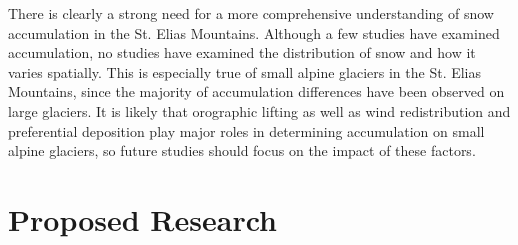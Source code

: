 \documentclass[12pt]{article}
\begin{document}
There is clearly a strong need for a more comprehensive understanding of snow accumulation in the St. Elias Mountains. Although a few studies have examined accumulation, no studies have examined the distribution of snow and how it varies spatially. This is especially true of small alpine glaciers in the St. Elias Mountains, since the majority of accumulation differences have been observed on large glaciers. It is likely that orographic lifting as well as wind redistribution and preferential deposition play major roles in determining accumulation on small alpine glaciers, so future studies should focus on the impact of these factors. 

\section{Proposed Research}
\end{document}

